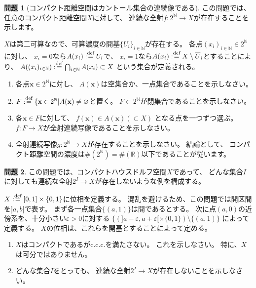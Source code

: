\documentclass[uplatex]{jsarticle}
\theoremstyle{definition}
\newtheorem{prob}[prob]{問題}
\renewcommand{\emptyset}{\varnothing}
\newcommand{\ep}{\varepsilon}
\newcommand{\dfn}{:\overset{\mbox{{\scriptsize def}}}{=}}
\newcommand{\R}{\mathbb{R}}
\newcommand{\N}{\mathbb{N}}
\begin{document}
\begin{prob}[コンパクト距離空間はカントール集合の連続像である]
  この問題では、任意のコンパクト距離空間\(X\)に対して、
  連続な全射\(f:2^{\N}\to X\)が存在することを示します。

  \(X\)は第二可算なので、可算濃度の開基\(\{U_i\}_{i\in \N}\)が存在する。
  各点\((x_i)_{i\in \N}\in 2^{\N}\)に対し、
  \(x_i = 0\)なら\(A(x_i)\dfn U_i\)で、
  \(x_i = 1\)なら\(A(x_i)\dfn X\setminus \overline{U}_i\)とすることにより、
  \(A((x_i)_{i\in \N}) \dfn \bigcap_{i\in \N}A(x_i)\subset X\)
  という集合が定義される。
  \begin{enumerate}
    \item
    各点\(\mathbf{x}\in 2^{\N}\)に対し、
    \(A(\mathbf{x})\)は空集合か、一点集合であることを示しなさい。
    \item
    \(F\dfn \{\mathbf{x}\in 2^{\N} | A(\mathbf{x})\neq \emptyset\)と置く。
    \(F\subset 2^{\N}\)が閉集合であることを示しなさい。
    \item
    各\(\mathbf{x}\in F\)に対して、
    \(f(\mathbf{x})\in A(\mathbf{x}) (\subset X)\)
    となる点を一つずつ選ぶ。
    \(f:F\to X\)が全射連続写像であることを示しなさい。
    \item
    全射連続写像\(g:2^{\N}\to X\)が存在することを示しなさい。
    結論として、
    コンパクト距離空間の濃度は\(\#(2^{\N}) = \#(\R)\)以下であることが従います。
  \end{enumerate}
\end{prob}



\begin{prob}\label{cpt but not ccc}
  この問題では、コンパクトハウスドルフ空間\(X\)であって、
  どんな集合\(I\)に対しても連続な全射\(2^I\to X\)が存在しないような例を構成する。

  \(X\dfn [0,1]\times \{0,1\}\)に位相を定義する。
  混乱を避けるため、この問題では開区間を\(]a,b[\)で表す。
  まず各一点集合\(\{(a,1)\}\)は開であるとする。
  次に点\((a,0)\)の近傍系を、十分小さい\(\ep > 0\)に対する
  \(\{ (]a-\ep,a+\ep[ \times \{0,1\}) \setminus \{(a,1)\}\)
  によって定義する。
  \(X\)の位相は、これらを開基とすることによって定める。
  \begin{enumerate}
    \item
    \(X\)はコンパクトであるがc.c.c.を満たさない。
    これを示しなさい。
    特に、\(X\)は可分ではありません。
    \item
    どんな集合\(I\)をとっても、
    連続な全射\(2^I\to X\)が存在しないことを示しなさい。
  \end{enumerate}
\end{prob}
\end{document}
